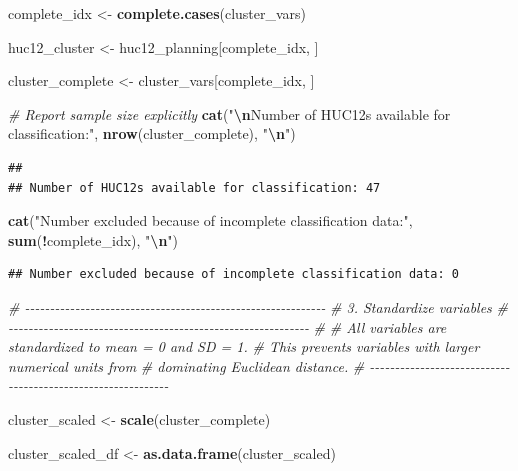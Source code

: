 \documentclass[
]{article}
\newenvironment{Shaded}{\begin{snugshade}}{\end{snugshade}}
\newcommand{\CommentTok}[1]{\textcolor[rgb]{0.56,0.35,0.01}{\textit{#1}}}
\newcommand{\FunctionTok}[1]{\textcolor[rgb]{0.13,0.29,0.53}{\textbf{#1}}}
\newcommand{\NormalTok}[1]{#1}
\newcommand{\OtherTok}[1]{\textcolor[rgb]{0.56,0.35,0.01}{#1}}
\newcommand{\SpecialCharTok}[1]{\textcolor[rgb]{0.81,0.36,0.00}{\textbf{#1}}}
\newcommand{\StringTok}[1]{\textcolor[rgb]{0.31,0.60,0.02}{#1}}
\begin{document}
\begin{Shaded}
\begin{Highlighting}[]
\NormalTok{complete\_idx }\OtherTok{\textless{}{-}} \FunctionTok{complete.cases}\NormalTok{(cluster\_vars)}

\NormalTok{huc12\_cluster }\OtherTok{\textless{}{-}}\NormalTok{ huc12\_planning[complete\_idx, ]}

\NormalTok{cluster\_complete }\OtherTok{\textless{}{-}}\NormalTok{ cluster\_vars[complete\_idx, ]}


\CommentTok{\# Report sample size explicitly}
\FunctionTok{cat}\NormalTok{(}\StringTok{"}\SpecialCharTok{\textbackslash{}n}\StringTok{Number of HUC12s available for classification:"}\NormalTok{,}
    \FunctionTok{nrow}\NormalTok{(cluster\_complete), }\StringTok{"}\SpecialCharTok{\textbackslash{}n}\StringTok{"}\NormalTok{)}
\end{Highlighting}
\end{Shaded}

\begin{verbatim}
## 
## Number of HUC12s available for classification: 47
\end{verbatim}

\begin{Shaded}
\begin{Highlighting}[]
\FunctionTok{cat}\NormalTok{(}\StringTok{"Number excluded because of incomplete classification data:"}\NormalTok{,}
    \FunctionTok{sum}\NormalTok{(}\SpecialCharTok{!}\NormalTok{complete\_idx), }\StringTok{"}\SpecialCharTok{\textbackslash{}n}\StringTok{"}\NormalTok{)}
\end{Highlighting}
\end{Shaded}

\begin{verbatim}
## Number excluded because of incomplete classification data: 0
\end{verbatim}

\begin{Shaded}
\begin{Highlighting}[]
\CommentTok{\# {-}{-}{-}{-}{-}{-}{-}{-}{-}{-}{-}{-}{-}{-}{-}{-}{-}{-}{-}{-}{-}{-}{-}{-}{-}{-}{-}{-}{-}{-}{-}{-}{-}{-}{-}{-}{-}{-}{-}{-}{-}{-}{-}{-}{-}{-}{-}{-}{-}{-}{-}{-}{-}{-}{-}{-}{-}{-}{-}{-}}
\CommentTok{\# 3. Standardize variables}
\CommentTok{\# {-}{-}{-}{-}{-}{-}{-}{-}{-}{-}{-}{-}{-}{-}{-}{-}{-}{-}{-}{-}{-}{-}{-}{-}{-}{-}{-}{-}{-}{-}{-}{-}{-}{-}{-}{-}{-}{-}{-}{-}{-}{-}{-}{-}{-}{-}{-}{-}{-}{-}{-}{-}{-}{-}{-}{-}{-}{-}{-}{-}}
\CommentTok{\#}
\CommentTok{\# All variables are standardized to mean = 0 and SD = 1.}
\CommentTok{\# This prevents variables with larger numerical units from}
\CommentTok{\# dominating Euclidean distance.}
\CommentTok{\# {-}{-}{-}{-}{-}{-}{-}{-}{-}{-}{-}{-}{-}{-}{-}{-}{-}{-}{-}{-}{-}{-}{-}{-}{-}{-}{-}{-}{-}{-}{-}{-}{-}{-}{-}{-}{-}{-}{-}{-}{-}{-}{-}{-}{-}{-}{-}{-}{-}{-}{-}{-}{-}{-}{-}{-}{-}{-}{-}{-}}

\NormalTok{cluster\_scaled }\OtherTok{\textless{}{-}} \FunctionTok{scale}\NormalTok{(cluster\_complete)}

\NormalTok{cluster\_scaled\_df }\OtherTok{\textless{}{-}} \FunctionTok{as.data.frame}\NormalTok{(cluster\_scaled)}
\end{Highlighting}
\end{Shaded}
\end{document}
